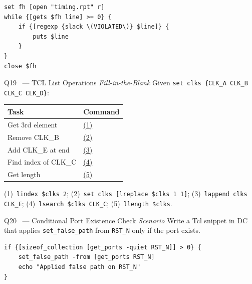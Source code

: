\documentclass[12pt,a4paper]{article}
\newcommand{\advanced}{%
  \fbox{\textcolor{advred}{\bfseries\sffamily\small ADVANCED}}}
\newcommand{\moderate}{%
  \fbox{\textcolor{modoran}{\bfseries\sffamily\small MODERATE}}}
\begin{document}
\begin{answerbox}
\begin{lstlisting}[style=tclstyle]
set fh [open "timing.rpt" r]
while {[gets $fh line] >= 0} {
    if {[regexp {slack \(VIOLATED\)} $line]} {
        puts $line
    }
}
close $fh
\end{lstlisting}
\end{answerbox}

\begin{questionbox}{Q19 \moderate\ --- TCL List Operations \hfill\textit{Fill-in-the-Blank}}
Given \texttt{set clks \{CLK\_A CLK\_B CLK\_C CLK\_D\}}:

\begin{center}
\begin{tabular}{|l|l|}
\hline
\rowcolor{dkblue!15}
\textbf{Task} & \textbf{Command}\\
\hline
Get 3rd element & \underline{(1)}\\
\hline
Remove CLK\_B & \underline{(2)}\\
\hline
Add CLK\_E at end & \underline{(3)}\\
\hline
Find index of CLK\_C & \underline{(4)}\\
\hline
Get length & \underline{(5)}\\
\hline
\end{tabular}
\end{center}
\end{questionbox}

\begin{answerbox}
(1)~\texttt{lindex \$clks 2};\quad
(2)~\texttt{set clks [lreplace \$clks 1 1]};\quad
(3)~\texttt{lappend clks CLK\_E};\quad
(4)~\texttt{lsearch \$clks CLK\_C};\quad
(5)~\texttt{llength \$clks}.
\end{answerbox}

\begin{questionbox}{Q20 \advanced\ --- Conditional Port Existence Check \hfill\textit{Scenario}}
Write a Tcl snippet in DC that applies \texttt{set\_false\_path} from \texttt{RST\_N} only if the port exists.
\end{questionbox}

\begin{answerbox}
\begin{lstlisting}[style=tclstyle]
if {[sizeof_collection [get_ports -quiet RST_N]] > 0} {
    set_false_path -from [get_ports RST_N]
    echo "Applied false path on RST_N"
}
\end{lstlisting}
\end{answerbox}
\end{document}
